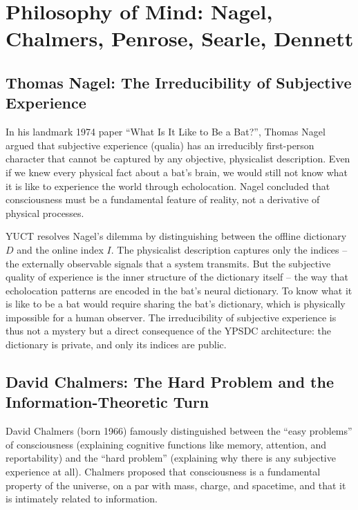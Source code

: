 \documentclass[12pt,a4paper]{article}
\begin{document}
	
	
	\section{Philosophy of Mind: Nagel, Chalmers, Penrose, Searle, Dennett}
	
	\subsection{Thomas Nagel: The Irreducibility of Subjective Experience}
	
	In his landmark 1974 paper ``What Is It Like to Be a Bat?'', Thomas Nagel argued that subjective experience (qualia) has an irreducibly first-person character that cannot be captured by any objective, physicalist description. Even if we knew every physical fact about a bat's brain, we would still not know what it is like to experience the world through echolocation. Nagel concluded that consciousness must be a fundamental feature of reality, not a derivative of physical processes.
	
	YUCT resolves Nagel's dilemma by distinguishing between the offline dictionary \(D\) and the online index \(I\). The physicalist description captures only the indices -- the externally observable signals that a system transmits. But the subjective quality of experience is the inner structure of the dictionary itself -- the way that echolocation patterns are encoded in the bat's neural dictionary. To know what it is like to be a bat would require sharing the bat's dictionary, which is physically impossible for a human observer. The irreducibility of subjective experience is thus not a mystery but a direct consequence of the YPSDC architecture: the dictionary is private, and only its indices are public.
	
	\subsection{David Chalmers: The Hard Problem and the Information-Theoretic Turn}
	
	David Chalmers (born 1966) famously distinguished between the ``easy problems'' of consciousness (explaining cognitive functions like memory, attention, and reportability) and the ``hard problem'' (explaining why there is any subjective experience at all). Chalmers proposed that consciousness is a fundamental property of the universe, on a par with mass, charge, and spacetime, and that it is intimately related to information.
	
\end{document}
